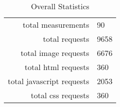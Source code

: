 \begin{table}[h]
\caption{Overall Statistics}\centering
\begin{tabular}{rl}
total measurements & 90\\
total requests & 9658\\
total image requests & 6676\\
total html requests & 360\\
total javascript requests & 2053\\
total css requests & 360\\
\end{tabular}
\end{table}
